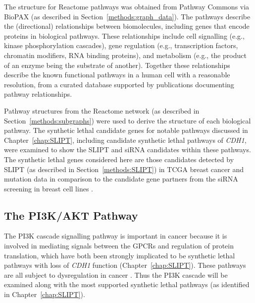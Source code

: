 The  structure for Reactome \glspl{pathway} was obtained from Pathway Commons via \gls{BioPAX} (as described in Section~\ref{methods:graph_data}). The \glspl{pathway} describe the (directional) relationships between biomolecules, including genes that encode proteins in biological \glspl{pathway}. These relationships include cell signalling (e.g., kinase phosphorylation cascades), gene regulation (e.g., transcription factors, chromatin modifiers, \acrshort{RNA} binding proteins), and metabolism (e.g., the product of an enzyme being the substrate of another). Together these relationships describe the known functional \glspl{pathway} in a human cell with a reasonable resolution, from a curated database supported by publications documenting \gls{pathway} relationships. 

Pathway structures from the Reactome network (as described in Section~\ref{methods:subgraphs}) were used to derive the  structure of each biological \gls{pathway}. The \gls{synthetic lethal} candidate genes for notable \glspl{pathway} discussed in Chapter~\ref{chap:SLIPT}, including candidate \gls{synthetic lethal} \glspl{pathway} of \textit{CDH1}, were examined to show the \gls{SLIPT} and \gls{siRNA} candidates within these \glspl{pathway}. The \gls{synthetic lethal} genes considered here are those candidates detected by \gls{SLIPT} (as described in Section~\ref{methods:SLIPT}) in \gls{TCGA} breast cancer  and \gls{mutation} data \citep{TCGA2012} in comparison to the candidate gene partners from the \gls{siRNA} screening in breast cell lines \citep{Telford2015}. 

\FloatBarrier

\subsection{The PI3K/AKT Pathway}  \label{chapt4:SL_Genes_PI3K}

\FloatBarrier

The \acrfull{PI3K} cascade signalling \gls{pathway} is important in cancer because it is involved in mediating signals between the \glspl{GPCR} and regulation of protein translation, which have both been strongly implicated to be \gls{synthetic lethal} \glspl{pathway} with loss of \textit{CDH1} function (Chapter~\ref{chap:SLIPT}). These \glspl{pathway} are all subject to dysregulation in cancer \citep{Dorsam2007, Courtney2010, Gao2015}. Thus the PI3K cascade will be examined along with the most supported \gls{synthetic lethal} \glspl{pathway} (as identified in Chapter~\ref{chap:SLIPT}). %

